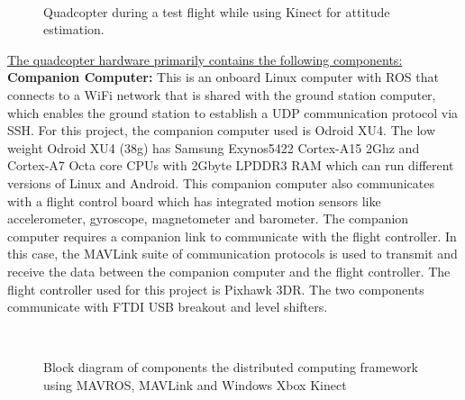 \documentclass[letterpaper%
, twoside%
, 12pt%
,memoire%
, english%
,creativecommons,hyperref%
]{thETS}
\begin{document}
\begin{figure}
	\centering
	 \\ \parbox{0.75\textwidth}{\caption{Quadcopter during a test flight while using Kinect for attitude estimation.\label{Fig:quad_flying}}}
\end{figure}

\underline{The quadcopter hardware primarily contains the following components:}\\
\textbf{Companion Computer:} This is an onboard Linux computer with ROS that connects to a WiFi network that is shared with the ground station computer, which enables the ground station to establish a UDP communication protocol via SSH. For this project, the companion computer used is Odroid XU4. The low weight Odroid XU4 (38g) has Samsung Exynos5422 Cortex-A15 2Ghz and Cortex-A7 Octa core CPUs with 2Gbyte LPDDR3 RAM which can run different versions of Linux and Android. This companion computer also communicates with a flight control board which has integrated motion sensors like accelerometer, gyroscope, magnetometer and barometer. The companion computer requires a companion link to communicate with the flight controller. In this case, the MAVLink suite of communication protocols is used to transmit and receive the data between the companion computer and the flight controller. The flight controller used for this project is Pixhawk 3DR. The two components communicate with FTDI USB breakout and level shifters. 


\begin{figure}[H]
	\centering
	\resizebox{0.75\textwidth}{!}{\fbox{}}
	 \\ \parbox{0.75\textwidth}{\caption{Block diagram of components the distributed computing framework using MAVROS, MAVLink and Windows Xbox Kinect \label{Fig:distributed}}}
\end{figure}
\end{document}
